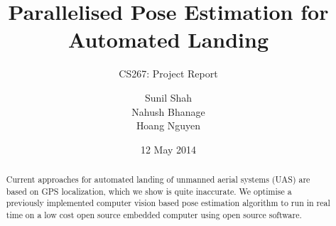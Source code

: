 \documentclass{acm_proc_article-sp}
\begin{document}
\title{Parallelised Pose Estimation for Automated Landing}
\subtitle{CS267: Project Report}
%
%
%
%
%

%
\author{
%
%
\alignauthor
Sunil Shah\\
\alignauthor
Nahush Bhanage\\
\alignauthor 
Hoang Nguyen\\
}

\date{12 May 2014}

\maketitle
\begin{abstract}
Current approaches for automated landing of unmanned aerial systems (UAS) are
based on GPS localization, which we show is quite inaccurate. We optimise a previously implemented computer vision based pose estimation algorithm to run in real time on a low cost open source embedded computer using open source software. \end{abstract}
\end{document}
